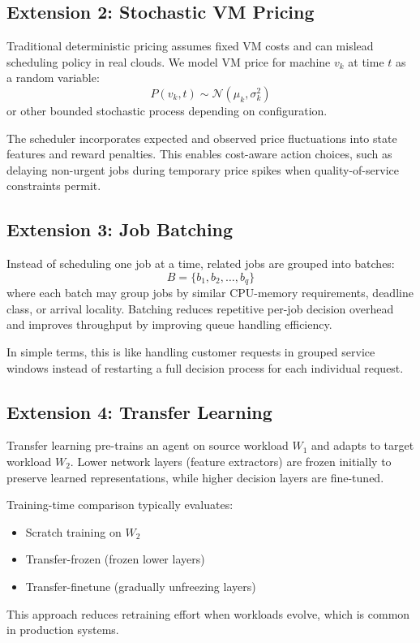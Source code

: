 \subsection{Extension 2: Stochastic VM Pricing}
Traditional deterministic pricing assumes fixed VM costs and can mislead scheduling policy in real clouds. We model VM price for machine $v_k$ at time $t$ as a random variable:
\[
P(v_k,t) \sim \mathcal{N}(\mu_k,\sigma_k^2)
\]
or other bounded stochastic process depending on configuration.

The scheduler incorporates expected and observed price fluctuations into state features and reward penalties. This enables cost-aware action choices, such as delaying non-urgent jobs during temporary price spikes when quality-of-service constraints permit.

\subsection{Extension 3: Job Batching}
Instead of scheduling one job at a time, related jobs are grouped into batches:
\[
B = \{b_1,b_2,\ldots,b_q\}
\]
where each batch may group jobs by similar CPU-memory requirements, deadline class, or arrival locality. Batching reduces repetitive per-job decision overhead and improves throughput by improving queue handling efficiency.

In simple terms, this is like handling customer requests in grouped service windows instead of restarting a full decision process for each individual request.

\subsection{Extension 4: Transfer Learning}
Transfer learning pre-trains an agent on source workload $W_1$ and adapts to target workload $W_2$. Lower network layers (feature extractors) are frozen initially to preserve learned representations, while higher decision layers are fine-tuned.

Training-time comparison typically evaluates:
\begin{itemize}
    \item Scratch training on $W_2$
    \item Transfer-frozen (frozen lower layers)
    \item Transfer-finetune (gradually unfreezing layers)
\end{itemize}

This approach reduces retraining effort when workloads evolve, which is common in production systems.

